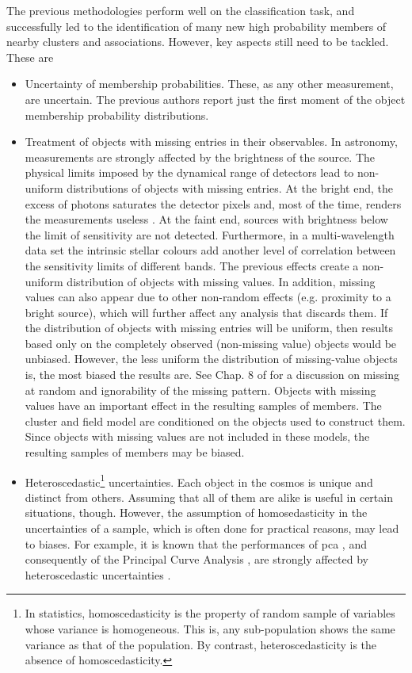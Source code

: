 The previous methodologies perform well on the classification task, and successfully led to the identification of many new high probability members of nearby clusters and associations. However, key aspects still need to be tackled. These are 
\begin{itemize}
\item Uncertainty of membership probabilities. These, as any other measurement, are uncertain. The previous authors report just the first moment of the object membership probability distributions.
\item Treatment of objects with missing entries in their observables. In astronomy, measurements are strongly affected by the brightness of the source. The physical limits imposed by the dynamical range of detectors lead to non-uniform distributions of objects with missing entries. At the bright end, the excess of photons saturates the detector pixels and, most of the time, renders the measurements useless \cite[however, see][ for examples of high-precision astrometry and photometry on saturated images]{2003hstc.conf..346M,2013AJ....146..106O}.  At the faint end, sources with brightness below the limit of sensitivity are not detected. Furthermore, in a multi-wavelength data set the intrinsic stellar colours add another level of correlation between the sensitivity limits of different bands. The previous effects create a non-uniform distribution of objects with missing values. In addition, missing values can also appear due to other non-random effects (e.g. proximity to a bright source), which will further affect any analysis that discards them. If the distribution of objects with missing entries will be uniform, then results based only on the completely observed (non-missing value) objects would be unbiased. However, the less uniform the distribution of missing-value objects is, the most biased the results are. See Chap. 8 of \citet{Gelman2013} for a discussion on missing at random and ignorability of the missing pattern. Objects with missing values have an important effect in the resulting samples of members. The cluster and field model are conditioned on the objects used to construct them. Since objects with missing values are not included in these models, the resulting samples of members may be biased.
\item Heteroscedastic\footnote{In statistics, homoscedasticity is the property of random sample of variables whose variance is homogeneous. This is, any sub-population shows the same variance as that of the population. By contrast, heteroscedasticity is the absence of homoscedasticity.} uncertainties. Each object in the cosmos is unique and distinct from others. Assuming that all of them are alike is useful in certain situations, though. However, the assumption of homosedasticity in the uncertainties of a sample, which is often done for practical reasons, may lead to biases. For example, it is known that the performances of \gls{pca} \cite[used by][]{KroneMartins2014}, and consequently of the Principal Curve Analysis \cite[used by][]{Sarro2014}, are strongly affected by heteroscedastic uncertainties \citep{Hong2016}. 

\end{itemize}
